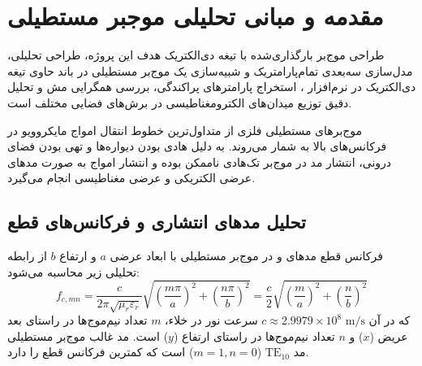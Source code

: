 \documentclass[11pt,a4paper]{article}
\begin{document}


\newpage
\tableofcontents
\newpage

\section{مقدمه و مبانی تحلیلی موجبر مستطیلی}

\begin{phboxp}{طراحی موج‌بر بارگذاری‌شده با تیغه دی‌الکتریک}
هدف این پروژه، طراحی تحلیلی، مدل‌سازی سه‌بعدی تمام‌پارامتریک و شبیه‌سازی یک موج‌بر مستطیلی در باند  حاوی تیغه دی‌الکتریک در نرم‌افزار ، استخراج پارامترهای پراکندگی، بررسی همگرایی مش و تحلیل دقیق توزیع میدان‌های الکترومغناطیسی در برش‌های فضایی مختلف است.
\end{phboxp}

موج‌برهای مستطیلی فلزی از متداول‌ترین خطوط انتقال امواج مایکروویو در فرکانس‌های بالا به شمار می‌روند. به دلیل هادی بودن دیواره‌ها  و تهی بودن فضای درونی، انتشار مد  در موج‌بر تک‌هادی ناممکن بوده و انتشار امواج به صورت مدهای عرضی الکتریکی  و عرضی مغناطیسی  انجام می‌گیرد.

\subsection{تحلیل مدهای انتشاری و فرکانس‌های قطع}
فرکانس قطع مدهای  و  در موج‌بر مستطیلی با ابعاد عرضی $a$ و ارتفاع $b$ از رابطه تحلیلی زیر محاسبه می‌شود:
\begin{equation}
f_{c,mn} = \frac{c}{2\pi \sqrt{\mu_r \varepsilon_r}} \sqrt{\left(\frac{m\pi}{a}\right)^2 + \left(\frac{n\pi}{b}\right)^2} = \frac{c}{2} \sqrt{\left(\frac{m}{a}\right)^2 + \left(\frac{n}{b}\right)^2}
\end{equation}
که در آن $c \approx 2.9979 \times 10^8\text{ m/s}$ سرعت نور در خلاء، $m$ تعداد نیم‌موج‌ها در راستای بعد عریض ($x$) و $n$ تعداد نیم‌موج‌ها در راستای ارتفاع ($y$) است.
مد غالب موج‌بر مستطیلی مد $\text{TE}_{10}$ ($m=1, n=0$) است که کمترین فرکانس قطع را دارد.
\end{document}
